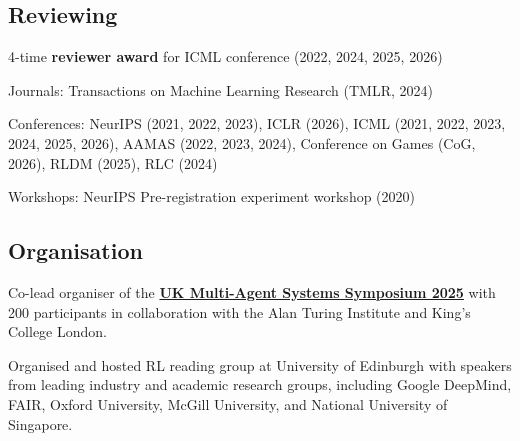 \documentclass[a4paper,12pt]{article}
\begin{document}
\subsection{Reviewing}
\begin{expblock}[\linewidth]
    \begin{explist}
	\item 4-time \textbf{reviewer award} for ICML conference (2022, 2024, 2025, 2026)
	\item Journals: Transactions on Machine Learning Research (TMLR, 2024)
	\item Conferences: NeurIPS (2021, 2022, 2023), ICLR (2026), ICML (2021, 2022, 2023, 2024, 2025, 2026), AAMAS (2022, 2023, 2024), Conference on Games (CoG, 2026), RLDM (2025), RLC (2024)
	\item Workshops: NeurIPS Pre-registration experiment workshop (2020)
    \end{explist}
\end{expblock}


\subsection{Organisation}
\begin{expblock}
    Co-lead organiser of the \href{https://www.turing.ac.uk/events/uk-multi-agent-systems-symposium-2025-uk-mas}{\textbf{UK Multi-Agent Systems Symposium 2025}} with 200 participants in collaboration with the Alan Turing Institute and King's College London.
\end{expblock}

\begin{expblock}
    Organised and hosted RL reading group at University of Edinburgh with speakers from leading industry and academic research groups, including Google DeepMind, FAIR, Oxford University, McGill University, and National University of Singapore.
\end{expblock}
\expspace
\end{document}
